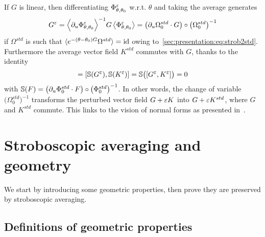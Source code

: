 \begin{remark} \label{sec:autonomous:rmk:std_link} If $G$ is linear, then
  differentiating $\Phi^{\varepsilon} _{\theta, \theta_0}$ w.r.t. $\theta$ and
  taking the average generates
  \begin{equation*}
    G^{\varepsilon} 
    = \Big \langle \partial_u \Phi^{\varepsilon}_{\theta, \theta_0} \Big \rangle^{-1} G \, 
      \big \langle \Phi^{\varepsilon} _{\theta, \theta_0} \big \rangle 
    = \big( \partial_u \Omega_0^{std} \cdot G \big) 
      \circ \big( \Omega_0^{std} \big)^{-1}
  \end{equation*}
  if $\Omega^{std}$ is such that $\langle e^{-(\theta-\theta_0) G}
  \Omega^{std} \rangle = \operatorname{id}$ owing to~\eqref{sec:presentation:eq:strob2std}.
  Furthermore the average vector field $K^{std}$ commutes with $G$, thanks
  to the identity
  \begin{equation*}
    [G,K^{std}] 
    = \left[ \mathbb S (G^\eps) , \mathbb S (K^\eps) \right]
    = \mathbb S \big( [G^\eps , K^\eps] \big)
    = 0
  \end{equation*}
  with $\mathbb S (F) = \big( \partial_u \Phi_0^{std} \cdot F \big) \circ
  \big( \Phi_0^{std} \big)^{-1}$. In other words, the change of variable
  $\big( \Omega^{std}_0 \big)^{-1}$ transforms the perturbed vector field
  $G + \varepsilon K$ into $G + \varepsilon K^{std}$, where $G$ and $K^{std}$ commute.
  This links to the vision of normal forms as presented in~\cite[Chap.
  IX]{sanders.2007.averaging}.
\end{remark}



\section{Stroboscopic averaging and geometry}
\label{sec:geometry}

We start by introducing some geometric properties, then prove they are
preserved by stroboscopic averaging.


\subsection{Definitions of geometric properties}

